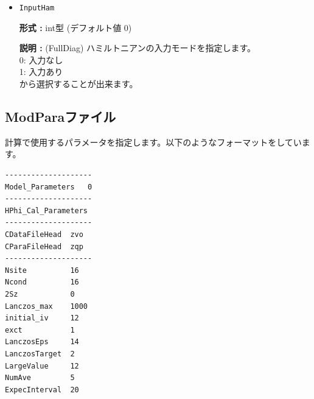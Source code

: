 \begin{itemize}
{\bf 説明 :} {
{
(FullDiag) ハミルトニアンの出力モードを指定します。\\
0: 出力なし\\
1: 出力あり\\
から選択することが出来ます。}
}

\item  \verb|InputHam|

{\bf 形式 :} {int型 (デフォルト値 0)}

{\bf 説明 :} {
{
(FullDiag) ハミルトニアンの入力モードを指定します。\\
0: 入力なし\\
1: 入力あり\\
から選択することが出来ます。}
}



\end{itemize}

\newpage
\subsection{{ModParaファイル}}
\label{Subsec:modpara}
計算で使用するパラメータを指定します。以下のようなフォーマットをしています。\\
\begin{minipage}{10cm}
\begin{screen}
\begin{verbatim}
--------------------
Model_Parameters   0
--------------------
HPhi_Cal_Parameters
--------------------
CDataFileHead  zvo
CParaFileHead  zqp
--------------------
Nsite          16   
Ncond          16    
2Sz            0    
Lanczos_max    1000 
initial_iv     12   
exct           1    
LanczosEps     14   
LanczosTarget  2    
LargeValue     12   
NumAve         5    
ExpecInterval  20   
\end{verbatim}
\end{screen}
\end{minipage}


